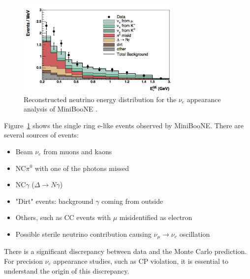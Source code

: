 \begin{figure}[htpb]
\centering\includegraphics[width=8cm,angle=0]{figures/miniboone-nue-plot.pdf}
\caption{Reconstructed neutrino energy distribution for the $\nu_e$ appearance analysis of MiniBooNE
\cite{miniboone-nue}.}
\label{fig:miniboone}
\end{figure}
Figure~\ref{fig:miniboone} shows the single ring e-like events observed by MiniBooNE. There are several sources of events:
\begin{itemize}
  \item Beam $\nu_e$ from muons and kaons
  \item NC$\pi^0$ with one of the photons missed
  \item NC$\gamma$ ($\Delta \rightarrow N \gamma$) 
  \item "Dirt" events: background $\gamma$ coming from outside
  \item Others, such as CC events with $\mu$ misidentified as electron
  \item Possible sterile neutrino contribution causing $\nu_\mu\rightarrow\nu_e$ oscillation
\end{itemize}
There is a significant discrepancy between data and the Monte Carlo prediction. For precision $\nu_e$ appearance studies, such as CP violation, it is essential to understand the origin of this discrepancy.

